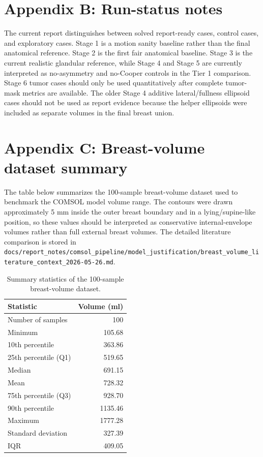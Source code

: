 \section*{Appendix B: Run-status notes}
\label{sec:appendix_status}

The current report distinguishes between solved report-ready cases, control cases, and exploratory cases. Stage 1 is a motion sanity baseline rather than the final anatomical reference. Stage 2 is the first fair anatomical baseline. Stage 3 is the current realistic glandular reference, while Stage 4 and Stage 5 are currently interpreted as no-asymmetry and no-Cooper controls in the Tier 1 comparison. Stage 6 tumor cases should only be used quantitatively after complete tumor-mask metrics are available. The older Stage 4 additive lateral/fullness ellipsoid cases should not be used as report evidence because the helper ellipsoids were included as separate volumes in the final breast union.

\section*{Appendix C: Breast-volume dataset summary}
\label{sec:appendix_volume_summary}

The table below summarizes the 100-sample breast-volume dataset used to benchmark the COMSOL model volume range. The contours were drawn approximately 5 mm inside the outer breast boundary and in a lying/supine-like position, so these values should be interpreted as conservative internal-envelope volumes rather than full external breast volumes. The detailed literature comparison is stored in \texttt{docs/report\_notes/comsol\_pipeline/model\_justification/breast\_volume\_literature\_context\_2026-05-26.md}.

\begin{table}[H]
\centering
\caption{Summary statistics of the 100-sample breast-volume dataset.}
\label{tab:appendix_breast_volume_dataset}
\begin{tabular}{lr}
\hline
Statistic & Volume (ml) \\
\hline
Number of samples & 100 \\
Minimum & 105.68 \\
10th percentile & 363.86 \\
25th percentile (Q1) & 519.65 \\
Median & 691.15 \\
Mean & 728.32 \\
75th percentile (Q3) & 928.70 \\
90th percentile & 1135.46 \\
Maximum & 1777.28 \\
Standard deviation & 327.39 \\
IQR & 409.05 \\
\hline
\end{tabular}
\end{table}

